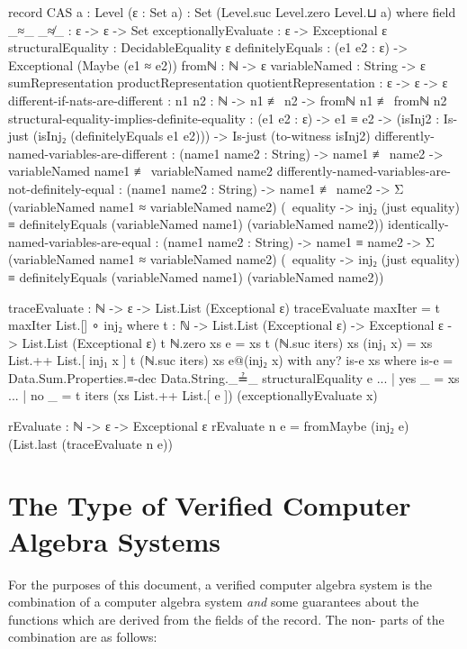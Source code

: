 \documentclass{report}
\begin{document}
\begin{code}
record CAS {a : Level} (ε : Set a) : Set (Level.suc Level.zero Level.⊔ a) where
  field
    _≈_
     _≉_ : ε -> ε -> Set
    exceptionallyEvaluate : ε -> Exceptional ε
    structuralEquality : DecidableEquality ε
    definitelyEquals : (e1 e2 : ε) -> Exceptional (Maybe (e1 ≈ e2))
    fromℕ : ℕ -> ε
    variableNamed : String -> ε
    sumRepresentation
     productRepresentation
     quotientRepresentation : ε -> ε -> ε
    different-if-nats-are-different :
      {n1 n2 : ℕ} -> n1 ≢ n2 -> fromℕ n1 ≢ fromℕ n2
    structural-equality-implies-definite-equality :
      (e1 e2 : ε) ->
      e1 ≡ e2 ->
      (isInj2 : Is-just (isInj₂ (definitelyEquals e1 e2))) ->
      Is-just (to-witness isInj2)
    differently-named-variables-are-different :
      (name1 name2 : String) ->
      name1 ≢ name2 ->
      variableNamed name1 ≢ variableNamed name2
    differently-named-variables-are-not-definitely-equal :
      (name1 name2 : String) ->
      name1 ≢ name2 ->
      Σ (variableNamed name1 ≈ variableNamed name2)
        (\ equality -> inj₂ (just equality) ≡ definitelyEquals (variableNamed name1) (variableNamed name2))
    identically-named-variables-are-equal :
      (name1 name2 : String) ->
      name1 ≡ name2 ->
      Σ (variableNamed name1 ≈ variableNamed name2)
        (\ equality -> inj₂ (just equality) ≡ definitelyEquals (variableNamed name1) (variableNamed name2))

  traceEvaluate : ℕ -> ε -> List.List (Exceptional ε)
  traceEvaluate maxIter = t maxIter List.[] ∘ inj₂
    where
    t : ℕ -> List.List (Exceptional ε) -> Exceptional ε -> List.List (Exceptional ε)
    t ℕ.zero xs e = xs
    t (ℕ.suc iters) xs (inj₁ x) = xs List.++ List.[ inj₁ x ]
    t (ℕ.suc iters) xs e@(inj₂ x) with any? is-e xs
      where is-e = Data.Sum.Properties.≡-dec Data.String._≟_ structuralEquality e
    ... | yes _ = xs
    ... | no _ = t iters (xs List.++ List.[ e ]) (exceptionallyEvaluate x)

  rEvaluate : ℕ -> ε -> Exceptional ε
  rEvaluate n e = fromMaybe (inj₂ e) (List.last (traceEvaluate n e))
\end{code}

\section{The Type of Verified Computer Algebra Systems}
For the purposes of this document, a verified computer algebra system is the combination of a  computer algebra system \emph{and} some guarantees about the functions which are derived from the fields of the  record.  The non- parts of the combination are as follows:
\end{document}
